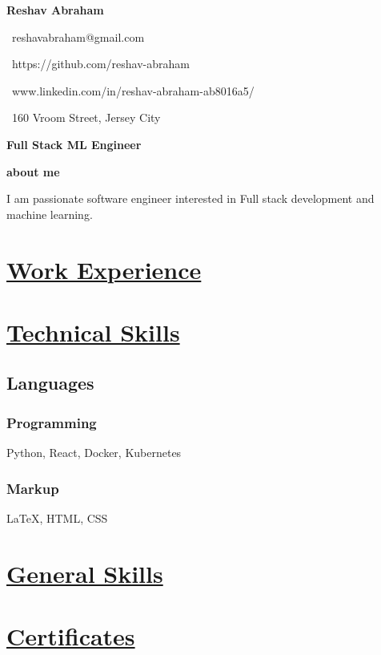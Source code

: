 \documentclass{article}
\begin{document}
\Huge\vspace{-1.3em}\hspace{-0.30em}\textbf{Reshav Abraham} 
    \begin{minipage}[t]{0.45\textwidth\hspace{2.75em}} 
        \small
        \faEnvelopeO \, reshavabraham@gmail.com
        
        \faGithub \, https://github.com/reshav-abraham 

        \faLinkedin \, www.linkedin.com/in/reshav-abraham-ab8016a5/

        \faHome \, 160 Vroom Street, Jersey City
    \end{minipage}

\vspace{-1.3em}\Large\textbf{Full Stack ML Engineer} 

\vspace{0.3em}\small\textbf{about me} 

\begin{minipage}[t]{0.45\textwidth\hspace{0.5em}}
I am passionate software engineer interested in Full stack development
and machine learning. \par
\end{minipage}

\section{\underline{Work Experience}}
\section{\underline{Technical Skills}}

\subsection{Languages}
\vspace{-0.3em}


\subsubsection{Programming}
Python, React, Docker, Kubernetes
\vspace{0.3em}

\subsubsection{Markup}
{\LaTeX}, HTML, CSS
\section{\underline{General Skills}}
\section{\underline{Certificates}}
\end{document}
